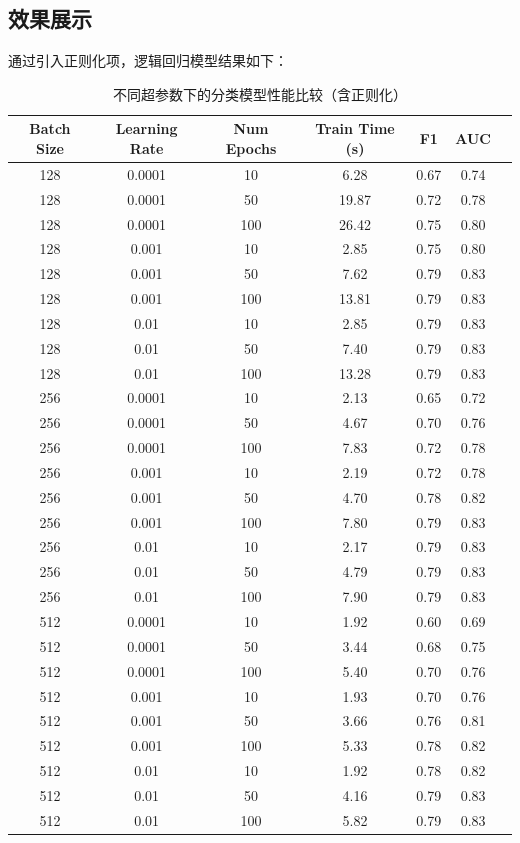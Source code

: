 \documentclass[12pt]{article}
\begin{document}
\subsection{效果展示}
通过引入正则化项，逻辑回归模型结果如下：
\begin{table}[H]
\centering
\caption{不同超参数下的分类模型性能比较（含正则化）}
\begin{tabular}{ccccccc}
\hline
\textbf{Batch Size} & \textbf{Learning Rate} & \textbf{Num Epochs} & \textbf{Train Time (s)} & \textbf{F1} & \textbf{AUC} \\ \hline
 128 & 0.0001 & 10 & 6.28 & 0.67 & 0.74 \\ 
 128 & 0.0001 & 50 & 19.87 & 0.72 & 0.78 \\ 
 128 & 0.0001 & 100 & 26.42 & 0.75 & 0.80 \\ 
 128 & 0.001 & 10 & 2.85 & 0.75 & 0.80 \\ 
 128 & 0.001 & 50 & 7.62 & 0.79 & 0.83 \\ 
 128 & 0.001 & 100 & 13.81 & 0.79 & 0.83 \\ 
 128 & 0.01 & 10 & 2.85 & 0.79 & 0.83 \\ 
 128 & 0.01 & 50 & 7.40 & 0.79 & 0.83 \\ 
 128 & 0.01 & 100 & 13.28 & 0.79 & 0.83 \\ 
 256 & 0.0001 & 10 & 2.13 & 0.65 & 0.72 \\ 
 256 & 0.0001 & 50 & 4.67 & 0.70 & 0.76 \\ 
 256 & 0.0001 & 100 & 7.83 & 0.72 & 0.78 \\ 
 256 & 0.001 & 10 & 2.19 & 0.72 & 0.78 \\ 
 256 & 0.001 & 50 & 4.70 & 0.78 & 0.82 \\ 
 256 & 0.001 & 100 & 7.80 & 0.79 & 0.83 \\ 
 256 & 0.01 & 10 & 2.17 & 0.79 & 0.83 \\ 
 256 & 0.01 & 50 & 4.79 & 0.79 & 0.83 \\ 
 256 & 0.01 & 100 & 7.90 & 0.79 & 0.83 \\ 
 512 & 0.0001 & 10 & 1.92 & 0.60 & 0.69 \\ 
 512 & 0.0001 & 50 & 3.44 & 0.68 & 0.75 \\
 512 & 0.0001 & 100 & 5.40 & 0.70 & 0.76 \\
 512 & 0.001 & 10 & 1.93 & 0.70 & 0.76 \\
 512 & 0.001 & 50 & 3.66 & 0.76 & 0.81 \\
 512 & 0.001 & 100 & 5.33 & 0.78 & 0.82 \\
 512 & 0.01 & 10 & 1.92 & 0.78 & 0.82 \\ 
 512 & 0.01 & 50 & 4.16 & 0.79 & 0.83 \\
 512 & 0.01 & 100 & 5.82 & 0.79 & 0.83 \\ 
 \hline
\end{tabular}

\label{tab:model_results}
\end{table}
\end{document}
